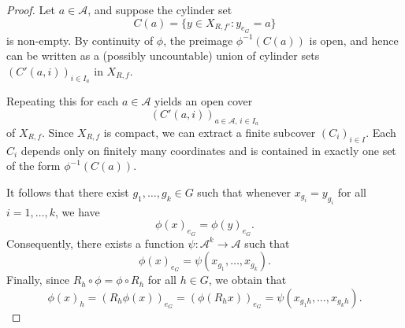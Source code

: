 \documentclass[10pt,a4paper]{amsart}
\begin{document}
\begin{proof}
Let $a \in \mathcal{A}$, and suppose the cylinder set 
\[
C(a) = \{y \in X_{R,f'} : y_{e_G} = a\}
\]
is non-empty. By continuity of $\phi$, the preimage $\phi^{-1}(C(a))$ 
is open, and hence can be written as a (possibly uncountable) union of 
cylinder sets $(C'(a,i))_{i \in I_a}$ in $X_{R,f}$. 

Repeating this for each $a \in \mathcal{A}$ yields an open cover 
\[
(C'(a,i))_{a \in \mathcal{A},\, i \in I_a}
\]
of $X_{R,f}$. Since $X_{R,f}$ is compact, we can extract a finite 
subcover $(C_i)_{i \in I}$. Each $C_i$ depends only on finitely many 
coordinates and is contained in exactly one set of the form 
$\phi^{-1}(C(a))$. 

It follows that there exist $g_1, \dots, g_k \in G$ such that whenever 
$x_{g_i} = y_{g_i}$ for all $i = 1, \dots, k$, we have 
\[
\phi(x)_{e_G} = \phi(y)_{e_G}.
\]
Consequently, there exists a function $\psi : \mathcal{A}^k \to \mathcal{A}$ 
such that
\[
\phi(x)_{e_G} = \psi(x_{g_1}, \dots, x_{g_k}).
\]
Finally, since $R_h \circ \phi = \phi \circ R_h$ for all $h \in G$, we obtain that
\[
\phi(x)_h 
= (R_h \phi(x))_{e_G} 
= (\phi(R_h x))_{e_G} 
= \psi(x_{g_1 h}, \dots, x_{g_k h}).
\]

\end{proof} 
\end{document}
